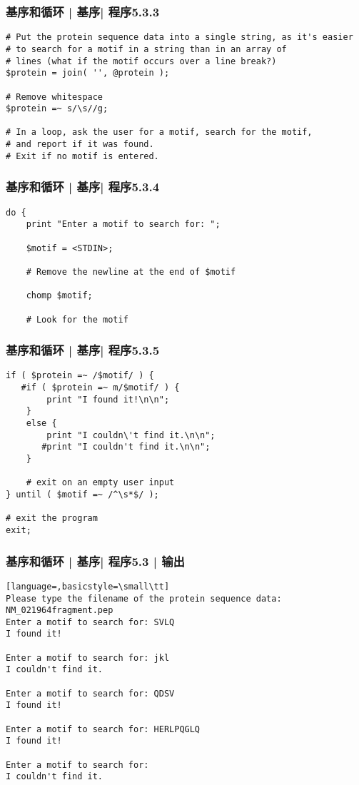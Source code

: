 \begin{frame}[fragile]
  \frametitle{基序和循环 | 基序| 程序5.3.3}
\begin{lstlisting}[firstnumber=27]
# Put the protein sequence data into a single string, as it's easier
# to search for a motif in a string than in an array of
# lines (what if the motif occurs over a line break?)
$protein = join( '', @protein );

# Remove whitespace
$protein =~ s/\s//g;

# In a loop, ask the user for a motif, search for the motif,
# and report if it was found.
# Exit if no motif is entered.
\end{lstlisting}
\end{frame}

\begin{frame}[fragile]
  \frametitle{基序和循环 | 基序| 程序5.3.4}
\begin{lstlisting}[firstnumber=38]
do {
    print "Enter a motif to search for: ";

    $motif = <STDIN>;

    # Remove the newline at the end of $motif

    chomp $motif;

    # Look for the motif
\end{lstlisting}
\end{frame}

\begin{frame}[fragile]
  \frametitle{基序和循环 | 基序| 程序5.3.5}
\begin{lstlisting}[firstnumber=49]
    if ( $protein =~ /$motif/ ) {
   #if ( $protein =~ m/$motif/ ) {
        print "I found it!\n\n";
    }
    else {
        print "I couldn\'t find it.\n\n";
       #print "I couldn't find it.\n\n";
    }

    # exit on an empty user input
} until ( $motif =~ /^\s*$/ );

# exit the program
exit;
\end{lstlisting}
\end{frame}

\begin{frame}[fragile]
  \frametitle{基序和循环 | 基序| 程序5.3 | 输出}
\begin{lstlisting}[language=,basicstyle=\small\tt]
Please type the filename of the protein sequence data:
NM_021964fragment.pep
Enter a motif to search for: SVLQ
I found it!

Enter a motif to search for: jkl
I couldn't find it.

Enter a motif to search for: QDSV
I found it!

Enter a motif to search for: HERLPQGLQ
I found it!

Enter a motif to search for: 
I couldn't find it.
\end{lstlisting}
\end{frame}

